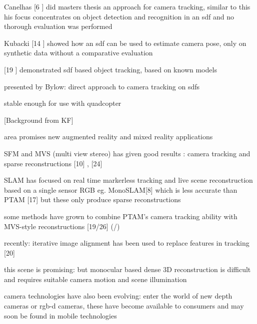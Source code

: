 Canelhas [6 \cite{Canelhas12Scene}] did masters thesis an approach for camera tracking, similar to this
his focus concentrates on object detection and recognition in an sdf and no thorough evaluation was performed

Kubacki [14 \cite{Kubacki12Registration}] showed how an sdf can be used to estimate camera pose, only on synthetic data without a comparative evaluation

[19 \cite{Ren12Unified}] demonstrated sdf based object tracking, based on known models

presented by Bylow: direct approach to camera tracking on sdfs


stable enough for use with quadcopter























[Background from KF]

area promises new augmented reality and mixed reality applications

SFM and MVS (multi view stereo) has given good results : camera tracking  and sparse reconstructions [10] \cite{Fitzgibbon98Automatic}, \cite{Seitz06Comparison} [24] 

SLAM has focused on real time markerless tracking and live scene reconstruction based on a single sensor RGB eg. MonoSLAM[8] \cite{Davison03Real} which is less accurate than PTAM [17] \cite{Klein07Parallel}  but these only produce sparse reconstructions

some methods have grown to combine PTAM's camera tracking ability with MVS-style reconstructions [19/26] (\cite{Newcombe10Live}/\cite{Stuhmer10Real})

recently: iterative image alignment has been used to replace features in tracking [20] \cite{Newcombe11Dtam}

this scene is promising: but monocular based dense 3D reconstruction is difficult and requires suitable camera motion and scene illumination

camera technologies have also been evolving: enter the world of new depth cameras or rgb-d cameras,
these have become available to consumers and may soon be found in mobile technologies \cite{Zhang12Microsoft}

